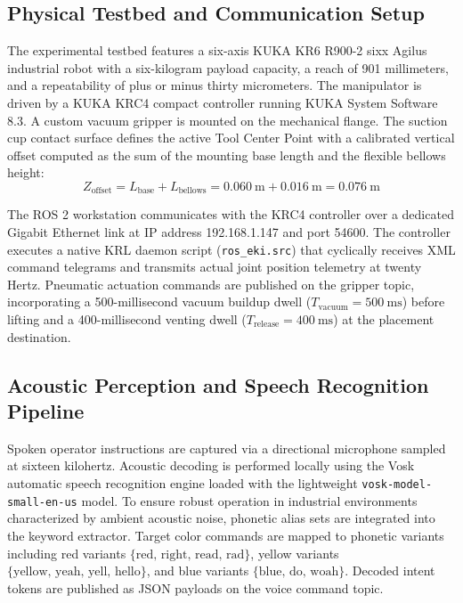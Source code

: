 \documentclass[runningheads]{llncs}
\begin{document}
\subsection{Physical Testbed and Communication Setup}
The experimental testbed features a six-axis KUKA KR6 R900-2 sixx Agilus industrial robot with a six-kilogram payload capacity, a reach of 901 millimeters, and a repeatability of plus or minus thirty micrometers. The manipulator is driven by a KUKA KRC4 compact controller running KUKA System Software 8.3. A custom vacuum gripper is mounted on the mechanical flange. The suction cup contact surface defines the active Tool Center Point with a calibrated vertical offset computed as the sum of the mounting base length and the flexible bellows height:
\begin{equation}
    Z_{\text{offset}} = L_{\text{base}} + L_{\text{bellows}} = \SI{0.060}{\meter} + \SI{0.016}{\meter} = \SI{0.076}{\meter}
\end{equation}

The ROS 2 workstation communicates with the KRC4 controller over a dedicated Gigabit Ethernet link at IP address 192.168.1.147 and port 54600. The controller executes a native KRL daemon script (\texttt{ros\_eki.src}) that cyclically receives XML command telegrams and transmits actual joint position telemetry at twenty Hertz. Pneumatic actuation commands are published on the gripper topic, incorporating a 500-millisecond vacuum buildup dwell ($T_{\text{vacuum}} = \SI{500}{\milli\second}$) before lifting and a 400-millisecond venting dwell ($T_{\text{release}} = \SI{400}{\milli\second}$) at the placement destination.

\subsection{Acoustic Perception and Speech Recognition Pipeline}
Spoken operator instructions are captured via a directional microphone sampled at sixteen kilohertz. Acoustic decoding is performed locally using the Vosk automatic speech recognition engine loaded with the lightweight \texttt{vosk-model-small-en-us} model. To ensure robust operation in industrial environments characterized by ambient acoustic noise, phonetic alias sets are integrated into the keyword extractor. Target color commands are mapped to phonetic variants including red variants $\{\text{red, right, read, rad}\}$, yellow variants $\{\text{yellow, yeah, yell, hello}\}$, and blue variants $\{\text{blue, do, woah}\}$. Decoded intent tokens are published as JSON payloads on the voice command topic.
\end{document}
